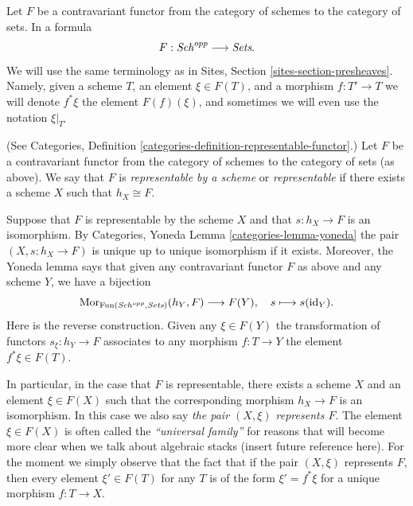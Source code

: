 \medskip\noindent
Let $F$ be a contravariant functor from the category
of schemes to the category of sets. In a formula
$$
F : \mathit{Sch}^{opp}
\longrightarrow
\textit{Sets}.
$$
We will use the same terminology as in Sites, Section
\ref{sites-section-presheaves}. Namely, given a scheme
$T$, an element $\xi \in F(T)$, and a morphism $f : T' \to T$
we will denote $f^*\xi$ the element $F(f)(\xi)$, and sometimes
we will even use the notation $\xi|_{T'}$

\begin{definition}
\label{definition-representable-functor}
(See Categories, Definition \ref{categories-definition-representable-functor}.)
Let $F$ be a contravariant functor from the category
of schemes to the category of sets (as above).
We say that $F$ is {\it representable by a scheme}
or {\it representable} if there exists a scheme $X$
such that $h_X \cong F$.
\end{definition}

\noindent
Suppose that $F$ is representable by the scheme $X$ and that
$s : h_X \to F$ is an isomorphism.
By Categories, Yoneda Lemma \ref{categories-lemma-yoneda}
the pair $(X, s : h_X \to F)$ is unique up to unique
isomorphism if it exists.
Moreover, the Yoneda lemma says that
given any contravariant functor $F$ as above
and any scheme $Y$, we have a bijection
$$
\mathop{\mathrm{Mor}}\nolimits_{\text{Fun}(\mathit{Sch}^{opp}, \textit{Sets})} (h_Y, F)
\longrightarrow
F(Y), \quad
s \longmapsto s(\text{id}_Y).
$$
Here is the reverse construction. Given any $\xi \in F(Y)$
the transformation of functors $s_\xi : h_Y \to F$
associates to any morphism $f : T \to Y$ the
element $f^*\xi \in F(T)$.

\medskip\noindent
In particular, in the case that $F$ is representable, there exists
a scheme $X$ and an element $\xi \in F(X)$ such that the corresponding
morphism $h_X \to F$ is an isomorphism.
In this case we also say {\it the pair $(X, \xi)$ represents $F$}.
The element $\xi \in F(X)$
is often called the {\it ``universal family''} for reasons that will become
more clear when we talk about algebraic stacks (insert future reference here).
For the moment we simply observe that the fact that if the pair $(X, \xi)$
represents $F$, then every element $\xi' \in F(T)$ for any $T$ is of
the form $\xi' = f^*\xi$ for a unique morphism $f : T \to X$.

